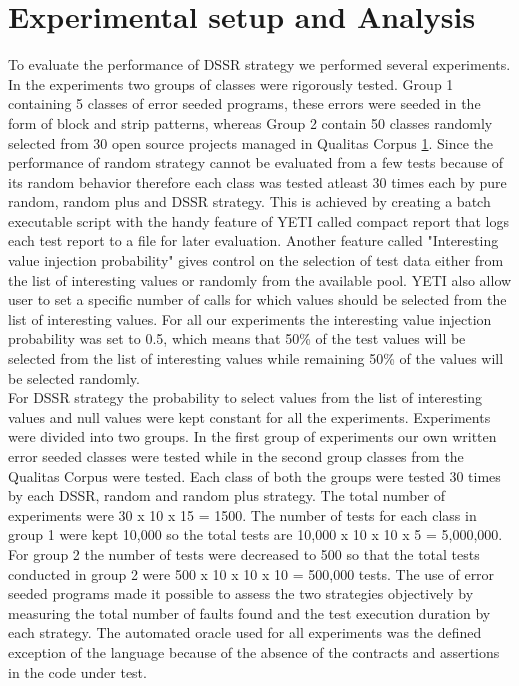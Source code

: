 
\section{Experimental setup and Analysis}

To evaluate the performance of DSSR strategy we performed several experiments. In the experiments two groups of classes were rigorously tested. Group 1 containing 5 classes of error seeded programs, these errors were seeded in the form of block and strip patterns, whereas Group 2 contain 50 classes randomly selected from 30 open source projects managed in Qualitas Corpus \ref{}. Since the performance of random strategy cannot be evaluated from a few tests because of its random behavior therefore each class was tested atleast 30 times each by pure random, random plus and DSSR strategy. This is achieved by creating a batch executable script with the handy feature of YETI called compact report that logs each test report to a file for later evaluation. Another feature called "Interesting value injection probability" gives control on the selection of test data either from the list of interesting values or randomly from the available pool. YETI also allow user to set a specific number of calls for which values should be selected from the list of interesting values. For all our experiments the interesting value injection probability was set to 0.5, which means that 50\% of the test values will be selected from the list of interesting values while remaining 50\% of the values will be selected randomly.\\

For DSSR strategy the probability to select values from the list of interesting values and null values were kept constant for all the experiments. Experiments were divided into two groups. In the first group of experiments our own written error seeded classes were tested while in the second group classes from the Qualitas Corpus were tested. Each class of both the groups were tested 30 times by each DSSR, random and random plus strategy. The total number of experiments were 30 x 10 x 15 = 1500. The number of tests for each class in group 1 were kept 10,000 so the total tests are 10,000 x 10 x 10 x 5 = 5,000,000.  For group 2 the number of tests were decreased to 500 so that the total tests conducted in group 2 were 500 x 10 x 10 x 10 = 500,000 tests. The use of error seeded programs made it possible to assess the two strategies objectively by measuring the total number of faults found and the test execution duration by each strategy. The automated oracle used for all experiments was the defined exception of the language because of the absence of the contracts and assertions in the code under test.\\

